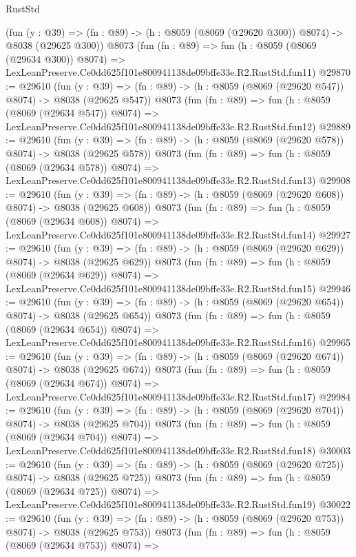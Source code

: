 \begin{lexlean}{RustStd}
\begin{coremodule}
    (fun (y : @39) => (fn : @89) -> (h : @8059 (@8069 (@29620 @300)) @8074) -> @8038 (@29625 @300))
    @8073
    (fun (fn : @89) =>
    fun (h : @8059 (@8069 (@29634 @300)) @8074) =>
    LexLeanPreserve.Ce0dd625f101e800941138de09bffe33e.R2.RustStd.fun11)
@29870 := @29610
    (fun (y : @39) => (fn : @89) -> (h : @8059 (@8069 (@29620 @547)) @8074) -> @8038 (@29625 @547))
    @8073
    (fun (fn : @89) =>
    fun (h : @8059 (@8069 (@29634 @547)) @8074) =>
    LexLeanPreserve.Ce0dd625f101e800941138de09bffe33e.R2.RustStd.fun12)
@29889 := @29610
    (fun (y : @39) => (fn : @89) -> (h : @8059 (@8069 (@29620 @578)) @8074) -> @8038 (@29625 @578))
    @8073
    (fun (fn : @89) =>
    fun (h : @8059 (@8069 (@29634 @578)) @8074) =>
    LexLeanPreserve.Ce0dd625f101e800941138de09bffe33e.R2.RustStd.fun13)
@29908 := @29610
    (fun (y : @39) => (fn : @89) -> (h : @8059 (@8069 (@29620 @608)) @8074) -> @8038 (@29625 @608))
    @8073
    (fun (fn : @89) =>
    fun (h : @8059 (@8069 (@29634 @608)) @8074) =>
    LexLeanPreserve.Ce0dd625f101e800941138de09bffe33e.R2.RustStd.fun14)
@29927 := @29610
    (fun (y : @39) => (fn : @89) -> (h : @8059 (@8069 (@29620 @629)) @8074) -> @8038 (@29625 @629))
    @8073
    (fun (fn : @89) =>
    fun (h : @8059 (@8069 (@29634 @629)) @8074) =>
    LexLeanPreserve.Ce0dd625f101e800941138de09bffe33e.R2.RustStd.fun15)
@29946 := @29610
    (fun (y : @39) => (fn : @89) -> (h : @8059 (@8069 (@29620 @654)) @8074) -> @8038 (@29625 @654))
    @8073
    (fun (fn : @89) =>
    fun (h : @8059 (@8069 (@29634 @654)) @8074) =>
    LexLeanPreserve.Ce0dd625f101e800941138de09bffe33e.R2.RustStd.fun16)
@29965 := @29610
    (fun (y : @39) => (fn : @89) -> (h : @8059 (@8069 (@29620 @674)) @8074) -> @8038 (@29625 @674))
    @8073
    (fun (fn : @89) =>
    fun (h : @8059 (@8069 (@29634 @674)) @8074) =>
    LexLeanPreserve.Ce0dd625f101e800941138de09bffe33e.R2.RustStd.fun17)
@29984 := @29610
    (fun (y : @39) => (fn : @89) -> (h : @8059 (@8069 (@29620 @704)) @8074) -> @8038 (@29625 @704))
    @8073
    (fun (fn : @89) =>
    fun (h : @8059 (@8069 (@29634 @704)) @8074) =>
    LexLeanPreserve.Ce0dd625f101e800941138de09bffe33e.R2.RustStd.fun18)
@30003 := @29610
    (fun (y : @39) => (fn : @89) -> (h : @8059 (@8069 (@29620 @725)) @8074) -> @8038 (@29625 @725))
    @8073
    (fun (fn : @89) =>
    fun (h : @8059 (@8069 (@29634 @725)) @8074) =>
    LexLeanPreserve.Ce0dd625f101e800941138de09bffe33e.R2.RustStd.fun19)
@30022 := @29610
    (fun (y : @39) => (fn : @89) -> (h : @8059 (@8069 (@29620 @753)) @8074) -> @8038 (@29625 @753))
    @8073
    (fun (fn : @89) =>
    fun (h : @8059 (@8069 (@29634 @753)) @8074) =>

\end{coremodule}
\end{lexlean}
